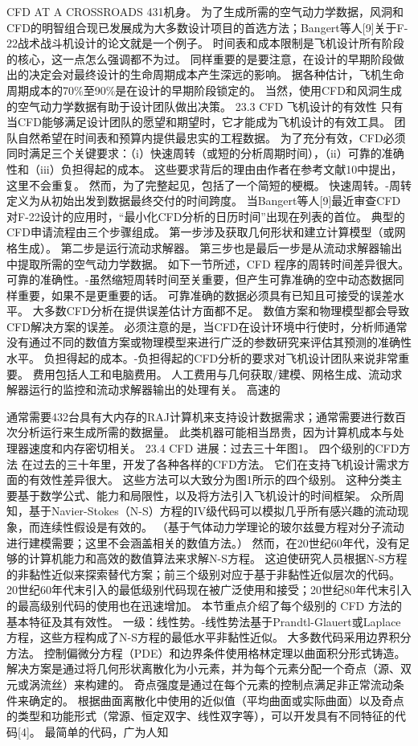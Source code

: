\documentclass[UTF8,11pt,a4paper,openany,fontset=fandol]{ctexbook}
\begin{document}
CFD AT A CROSSROADS 431机身。 为了生成所需的空气动力学数据，风洞和CFD的明智组合现已发展成为大多数设计项目的首选方法；Bangert等人[9]关于F-22战术战斗机设计的论文就是一个例子。 时间表和成本限制是飞机设计所有阶段的核心，这一点怎么强调都不为过。 同样重要的是要注意，在设计的早期阶段做出的决定会对最终设计的生命周期成本产生深远的影响。 据各种估计，飞机生命周期成本的70\%至90\%是在设计的早期阶段锁定的。 当然，使用CFD和风洞生成的空气动力学数据有助于设计团队做出决策。 23.3 CFD 飞机设计的有效性 只有当CFD能够满足设计团队的愿望和期望时，它才能成为飞机设计的有效工具。 团队自然希望在时间表和预算内提供最忠实的工程数据。 为了充分有效，CFD必须同时满足三个关键要求：（i）快速周转（或短的分析周期时间），（ii）可靠的准确性和（iii）负担得起的成本。 这些要求背后的理由由作者在参考文献10中提出，这里不会重复。 然而，为了完整起见，包括了一个简短的梗概。 快速周转。-周转定义为从初始出发到数据最终交付的时间跨度。 当Bangert等人[9]最近审查CFD对F-22设计的应用时，“最小化CFD分析的日历时间”出现在列表的首位。 典型的CFD申请流程由三个步骤组成。 第一步涉及获取几何形状和建立计算模型（或网格生成）。 第二步是运行流动求解器。 第三步也是最后一步是从流动求解器输出中提取所需的空气动力学数据。 如下一节所述，CFD 程序的周转时间差异很大。 可靠的准确性。-虽然缩短周转时间至关重要，但产生可靠准确的空中动态数据同样重要，如果不是更重要的话。 可靠准确的数据必须具有已知且可接受的误差水平。 大多数CFD分析在提供误差估计方面都不足。 数值方案和物理模型都会导致CFD解决方案的误差。 必须注意的是，当CFD在设计环境中行使时，分析师通常没有通过不同的数值方案或物理模型来进行广泛的参数研究来评估其预测的准确性水平。 负担得起的成本。-负担得起的CFD分析的要求对飞机设计团队来说非常重要。 费用包括人工和电脑费用。 人工费用与几何获取/建模、网格生成、流动求解器运行的监控和流动求解器输出的处理有关。 高速的

通常需要432台具有大内存的RAJ计算机来支持设计数据需求；通常需要进行数百次分析运行来生成所需的数据量。 此类机器可能相当昂贵，因为计算机成本与处理器速度和内存密切相关。 23.4 CFD 进展：过去三十年图1。 四个级别的CFD方法 在过去的三十年里，开发了各种各样的CFD方法。 它们在支持飞机设计需求方面的有效性差异很大。 这些方法可以大致分为图1所示的四个级别。 这种分类主要基于数学公式、能力和局限性，以及将方法引入飞机设计的时间框架。 众所周知，基于Navier-Stokes（N-S）方程的IV级代码可以模拟几乎所有感兴趣的流动现象，而连续性假设是有效的。 （基于气体动力学理论的玻尔兹曼方程对分子流动进行建模需要；这里不会涵盖相关的数值方法。） 然而，在20世纪60年代，没有足够的计算机能力和高效的数值算法来求解N-S方程。 这迫使研究人员根据N-S方程的非黏性近似来探索替代方案；前三个级别对应于基于非黏性近似层次的代码。 20世纪60年代末引入的最低级别代码现在被广泛使用和接受；20世纪80年代末引入的最高级别代码的使用也在迅速增加。 本节重点介绍了每个级别的 CFD 方法的基本特征及其有效性。 一级：线性势。-线性势法基于Prandtl-Glauert或Laplace方程，这些方程构成了N-S方程的最低水平非黏性近似。 大多数代码采用边界积分方法。 控制偏微分方程（PDE）和边界条件使用格林定理以曲面积分形式铸造。 解决方案是通过将几何形状离散化为小元素，并为每个元素分配一个奇点（源、双元或涡流丝）来构建的。 奇点强度是通过在每个元素的控制点满足非正常流动条件来确定的。 根据曲面离散化中使用的近似值（平均曲面或实际曲面）以及奇点的类型和功能形式（常源、恒定双字、线性双字等），可以开发具有不同特征的代码[4]。 最简单的代码，广为人知
\end{document}
